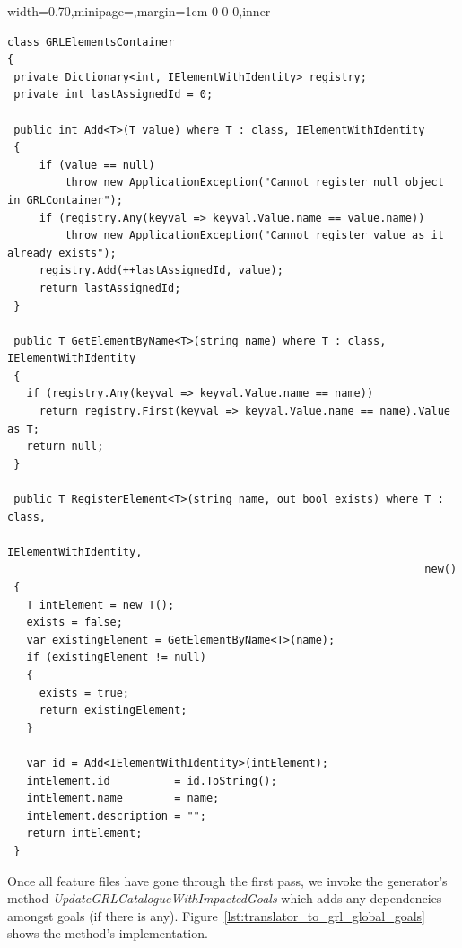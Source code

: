 \documentclass[dissertation,final]{softeng}
\newenvironment{featurecode}[1]
{ \lrbox\featurebox \begin{adjustbox}{width=#1\textwidth,minipage=\textwidth,margin=1cm 0 0 0,inner} }
{ \end{adjustbox}\endlrbox}
\newenvironment{featurelist}[2]
{
\newcommand{\setcaption}{\caption{#1}}
\newcommand{\setlabel}{\label{#2}}
}
{\begin{listing}[h!]\centering\usebox\featurebox\setcaption\setlabel\end{listing}}
\begin{document}
\begin{featurelist}{Translator to GRL -- a Registry object for GRL elements}{lst:translator_to_grl_registry}
\begin{featurecode}{0.70}
\begin{verbatim}
class GRLElementsContainer
{
 private Dictionary<int, IElementWithIdentity> registry;
 private int lastAssignedId = 0;
 
 public int Add<T>(T value) where T : class, IElementWithIdentity
 {
     if (value == null)
         throw new ApplicationException("Cannot register null object in GRLContainer");
     if (registry.Any(keyval => keyval.Value.name == value.name))
         throw new ApplicationException("Cannot register value as it already exists");
     registry.Add(++lastAssignedId, value);
     return lastAssignedId;
 }
 
 public T GetElementByName<T>(string name) where T : class, IElementWithIdentity
 {
   if (registry.Any(keyval => keyval.Value.name == name))
     return registry.First(keyval => keyval.Value.name == name).Value as T;
   return null;
 }
 
 public T RegisterElement<T>(string name, out bool exists) where T : class, 
                                                                 IElementWithIdentity, 
                                                                 new()
 {
   T intElement = new T();
   exists = false;
   var existingElement = GetElementByName<T>(name);
   if (existingElement != null)
   {
     exists = true;
     return existingElement;
   }

   var id = Add<IElementWithIdentity>(intElement);
   intElement.id          = id.ToString();
   intElement.name        = name;
   intElement.description = "";
   return intElement;
 }
\end{verbatim}
\end{featurecode}
\end{featurelist}

Once all feature files have gone through the first pass, we invoke the generator's method \emph{UpdateGRLCatalogueWithImpactedGoals} which adds any dependencies amongst goals (if there is any). Figure~\ref{lst:translator_to_grl_global_goals} shows the method's implementation. 
\end{document}
